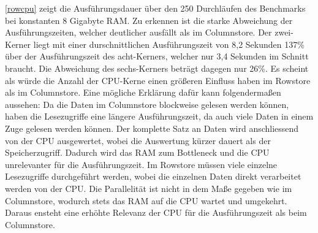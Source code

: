 \autoref{rowcpu} zeigt die Ausführungsdauer über den 250 Durchläufen des Benchmarks bei konstanten 8 Gigabyte RAM. Zu erkennen ist die starke Abweichung der Ausführungszeiten, welcher deutlicher ausfällt als im Columnstore. Der zwei-Kerner liegt mit einer durschnittlichen Ausführungszeit von 8,2 Sekunden 137\% über der Ausführungszeit des acht-Kerners, welcher nur 3,4 Sekunden im Schnitt braucht. Die Abweichung des sechs-Kerners beträgt dagegen nur 26\%. 
Es scheint als würde die Anzahl der CPU-Kerne einen größeren Einfluss haben im Rowstore als im Columnstore. Eine mögliche Erklärung dafür kann folgendermaßen aussehen: 
Da die Daten im Columnstore blockweise gelesen werden können, haben die Lesezugriffe eine längere Ausführungszeit, da auch viele Daten in einem Zuge gelesen werden können. Der komplette Satz an Daten wird anschliessend von der CPU ausgewertet, wobei die Auswertung kürzer dauert als der Speicherzugriff. Dadurch wird das RAM zum Bottleneck und die CPU unrelevanter für die Ausführungszeit. 
Im Rowstore müssen viele einzelne Lesezugriffe durchgeführt werden, wobei die einzelnen Daten direkt verarbeitet werden von der CPU. Die Parallelität ist nicht in dem Maße gegeben wie im Columnstore, wodurch stets das RAM auf die CPU wartet und umgekehrt. Daraus ensteht eine erhöhte Relevanz der CPU für die Ausführungszeit als beim Columnstore. 

\begin{figure}[H]
\end{figure}

